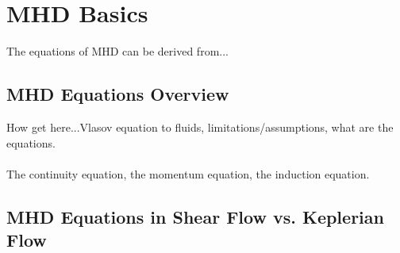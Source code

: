 \section{MHD Basics}
The equations of MHD can be derived from...

\subsection{MHD Equations Overview}
How get here...Vlasov equation to fluids, limitations/assumptions, what are the equations.\\
\\
The continuity equation, the momentum equation, the induction equation. 


\subsection{MHD Equations in Shear Flow vs. Keplerian Flow}
